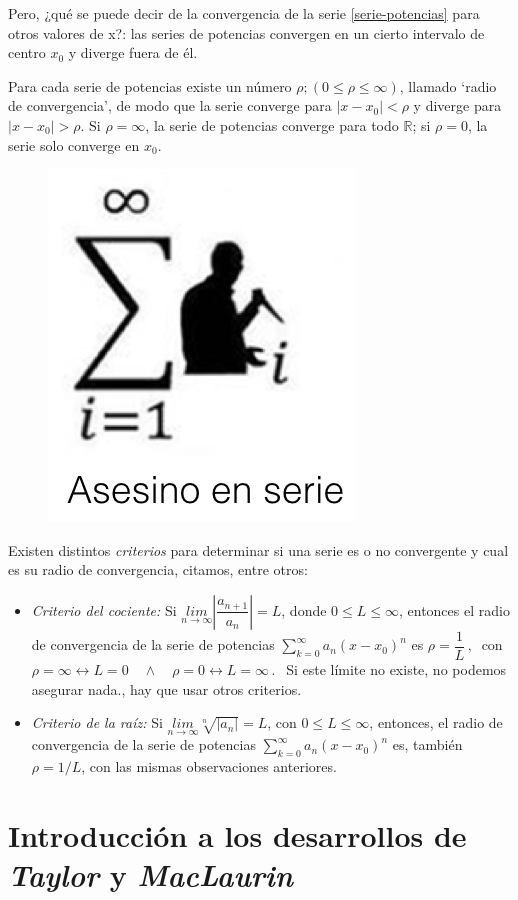 	\begin{multicols}{2}
	Pero, ¿qué se puede decir de la convergencia de la serie \ref{serie-potencias} para otros valores de x?: las series de potencias convergen en un cierto intervalo de centro $x_0$ y diverge fuera de él. 

	Para cada serie de potencias existe un número $\rho; (0\le \rho \le  \infty)$, llamado `radio de convergencia', de modo que la serie converge para $|x-x_0|<\rho$ y diverge para $|x-x_0|>\rho$. Si $\rho=\infty$, la serie de potencias converge para todo $\mathbb R$; si $\rho=0$, la serie solo converge en $x_0$.
	\begin{figure}[H]
		\centering
		\includegraphics[width=0.15
	\textwidth]{imagenes/Taylor/xiste06.png}
	\end{figure}
	

\end{multicols}




Existen distintos \emph{criterios} para determinar si una serie es o no convergente y cual es su radio de convergencia, citamos, entre otros:
\begin{itemize}
	\item \emph{Criterio del cociente: } Si $\underset {n\to \infty}{lim}{\left| \dfrac {a_{n+1}}{a_n} \right|}=L$, donde $0\le L \le \infty$, entonces el radio de convergencia de la serie de potencias $\sum _{ k=0 }^{ \infty }{a_n(x-x_0)^n}$ es $\rho=\dfrac 1 L\, , \ $ con $\rho=\infty \leftrightarrow L=0 \quad \wedge \quad \rho=0 \leftrightarrow L=\infty\, . \ \ $
	Si este límite no existe, no podemos asegurar nada., hay que usar otros criterios.
	\item \emph{Criterio de la raíz: } Si $\underset{n\to \infty}{lim}{\sqrt[n]{|a_n|}}=L$,  con  $ 0\le L \le \infty$, entonces, el radio de convergencia de la serie de potencias $\sum _{ k=0 }^{ \infty }{a_n(x-x_0)^n}$ es, también  $\rho=1/L$, con las mismas observaciones anteriores.
\end{itemize} 

\vspace{10mm}%
\section[Introducción a los desarrollos de \emph{Taylor} y \emph{MacLaurin}]{Introducción a los desarrollos de \emph{Taylor} y \emph{MacLaurin} }

